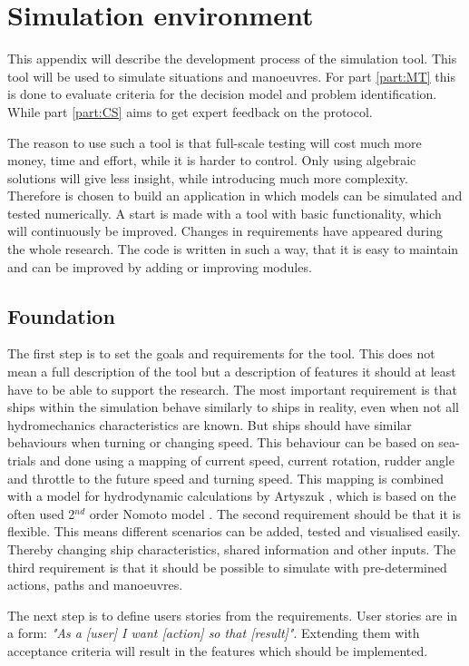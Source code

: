\chapter{Simulation environment}
\label{app:tool}
This appendix will describe the development process of the simulation tool. This tool will be used to simulate situations and manoeuvres. For part \ref{part:MT} this is done to evaluate criteria for the decision model and problem identification. While part \ref{part:CS} aims to get expert feedback on the protocol.

The reason to use such a tool is that full-scale testing will cost much more money, time and effort, while it is harder to control. Only using algebraic solutions will give less insight, while introducing much more complexity. Therefore is chosen to build an application in which models can be simulated and tested numerically.
A start is made with a tool with basic functionality, which will continuously be improved. Changes in requirements have appeared during the whole research. The code is written in such a way, that it is easy to maintain and can be improved by adding or improving modules.

\section{Foundation}
The first step is to set the goals and requirements for the tool. This does not mean a full description of the tool but a description of features it should at least have to be able to support the research.
The most important requirement is that ships within the simulation behave similarly to ships in reality, even when not all hydromechanics characteristics are known. But ships should have similar behaviours when turning or changing speed. This behaviour can be based on sea-trials and done using a mapping of current speed, current rotation, rudder angle and throttle to the future speed and turning speed. This mapping is combined with a model for hydrodynamic calculations by Artyszuk \cite{Artyszuk2016}, which is based on the often used 2$^{nd}$ order Nomoto model \cite{Nomoto1957}.
The second requirement should be that it is flexible. This means different scenarios can be added, tested and visualised easily. Thereby changing ship characteristics, shared information and other inputs.
The third requirement is that it should be possible to simulate with pre-determined actions, paths and manoeuvres.

The next step is to define users stories from the requirements. User stories are in a form: \emph{"As a [user] I want [action] so that [result]"}. Extending them with acceptance criteria will result in the features which should be implemented.

